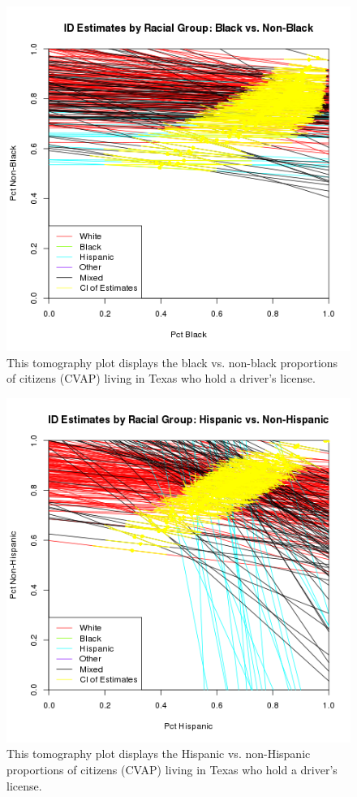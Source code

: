 \documentclass[12pt]{article}
\begin{document}
\begin{figure}[htb]
\begin{centering}
\includegraphics[scale=.75]{figs/CVAP_f3_dl_black.png}
\caption{\label{tomog_black}This tomography plot displays the black vs. non-black proportions of citizens (CVAP)
living in Texas who hold a driver's license.}
\end{centering}
\end{figure}

\begin{figure}[htb]
\begin{centering}
\includegraphics[scale=.75]{figs/CVAP_f3_dl_hispanic.png}
\caption{\label{tomog_hispanic}This tomography plot displays the Hispanic vs. non-Hispanic proportions of citizens (CVAP)
living in Texas who hold a driver's license.}
\end{centering}
\end{figure}
\end{document}

